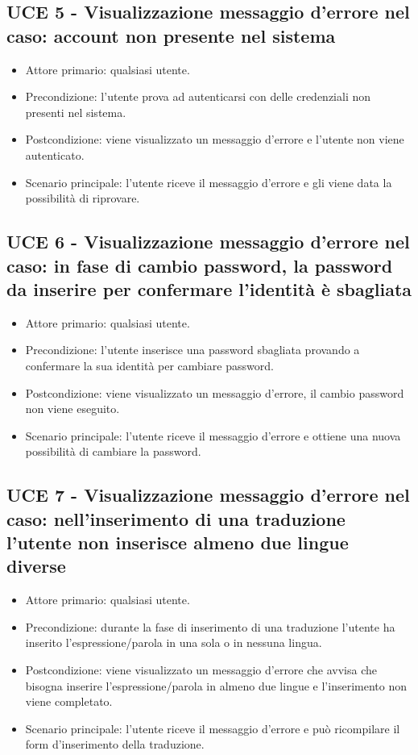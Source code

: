 \subsection{UCE 5 - Visualizzazione messaggio d'errore nel caso: account non presente nel sistema}
    \begin{itemize}
        \item Attore primario: qualsiasi utente.
        \item Precondizione: l'utente prova ad autenticarsi con delle credenziali non presenti nel sistema.
        \item Postcondizione: viene visualizzato un messaggio d'errore e l'utente non viene autenticato.
        \item Scenario principale: l'utente riceve il messaggio d'errore e gli viene data la possibilità di riprovare.
    \end{itemize}
\subsection{UCE 6 - Visualizzazione messaggio d'errore nel caso: in fase di cambio password, la password da inserire per confermare l'identità è sbagliata}
    \begin{itemize}
        \item Attore primario: qualsiasi utente.
        \item Precondizione: l'utente inserisce una password sbagliata provando a confermare la sua identità per cambiare password.
        \item Postcondizione: viene visualizzato un messaggio d'errore, il cambio password non viene eseguito.
        \item Scenario principale: l'utente riceve il messaggio d'errore e ottiene una nuova possibilità di cambiare la password.
    \end{itemize}
\subsection{UCE 7 - Visualizzazione messaggio d'errore nel caso: nell'inserimento di una traduzione l'utente non inserisce almeno due lingue diverse}
    \begin{itemize}
        \item Attore primario: qualsiasi utente.
        \item Precondizione: durante la fase di inserimento di una traduzione l'utente ha inserito l'espressione/parola in una sola o in nessuna lingua.
        \item Postcondizione: viene visualizzato un messaggio d'errore che avvisa che bisogna inserire l'espressione/parola in almeno due lingue e l'inserimento non viene completato.
        \item Scenario principale: l'utente riceve il messaggio d'errore e può ricompilare il form d'inserimento della traduzione.
    \end{itemize}
